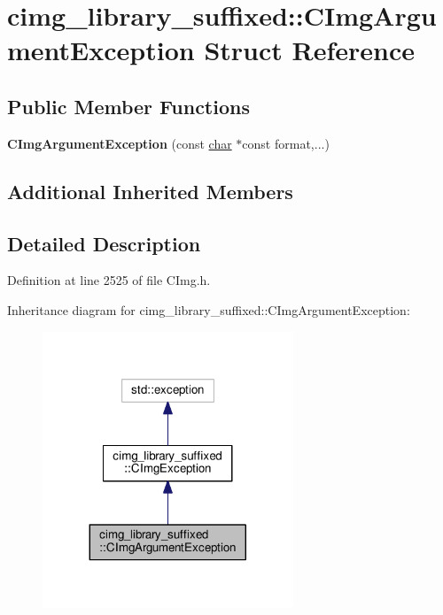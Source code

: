 \hypertarget{structcimg__library__suffixed_1_1CImgArgumentException}{}\section{cimg\+\_\+library\+\_\+suffixed\+:\+:C\+Img\+Argument\+Exception Struct Reference}
\label{structcimg__library__suffixed_1_1CImgArgumentException}
\subsection*{Public Member Functions}
\begin{DoxyCompactItemize}
\item 
\mbox{\label{structcimg__library__suffixed_1_1CImgArgumentException_aa9078e8f95f0a437aac753b505a79255}} 
{\bfseries C\+Img\+Argument\+Exception} (const \hyperlink{classchar}{char} $\ast$const format,...)
\end{DoxyCompactItemize}
\subsection*{Additional Inherited Members}


\subsection{Detailed Description}


Definition at line 2525 of file C\+Img.\+h.



Inheritance diagram for cimg\+\_\+library\+\_\+suffixed\+:\+:C\+Img\+Argument\+Exception\+:
\nopagebreak
\begin{figure}[H]
\begin{center}
\leavevmode
\includegraphics[width=212pt]{d3/d4a/structcimg__library__suffixed_1_1CImgArgumentException__inherit__graph}
\end{center}
\end{figure}


